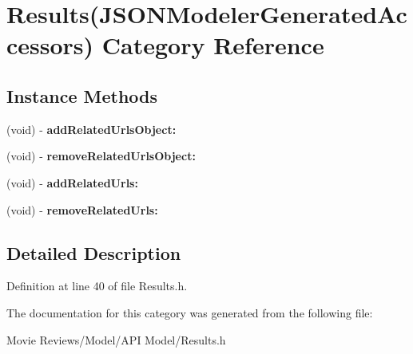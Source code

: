 \section{Results(J\+S\+O\+N\+Modeler\+Generated\+Accessors) Category Reference}
\label{category_results_07_j_s_o_n_modeler_generated_accessors_08}
\subsection*{Instance Methods}
\begin{DoxyCompactItemize}
\item 
(void) -\/ {\bfseries add\+Related\+Urls\+Object\+:}\label{category_results_07_j_s_o_n_modeler_generated_accessors_08_a1526b26c50ede74a2ba0fa0eb300cf71}

\item 
(void) -\/ {\bfseries remove\+Related\+Urls\+Object\+:}\label{category_results_07_j_s_o_n_modeler_generated_accessors_08_ac2e2798ae76c1aee90454218b74fefe7}

\item 
(void) -\/ {\bfseries add\+Related\+Urls\+:}\label{category_results_07_j_s_o_n_modeler_generated_accessors_08_a2f78d2ed026fcabd68d597555d315125}

\item 
(void) -\/ {\bfseries remove\+Related\+Urls\+:}\label{category_results_07_j_s_o_n_modeler_generated_accessors_08_a35442fde79db691eb5a1f9938a4907d3}

\end{DoxyCompactItemize}


\subsection{Detailed Description}


Definition at line 40 of file Results.\+h.



The documentation for this category was generated from the following file\+:\begin{DoxyCompactItemize}
\item 
Movie Reviews/\+Model/\+A\+P\+I Model/Results.\+h\end{DoxyCompactItemize}
